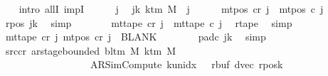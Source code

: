 \begin{isabellebody}
\ \ \isamarkupfalse%
\ {\isacharparenleft}{\kern0pt}intro\ allI\ impI{\isacharparenright}{\kern0pt}\isanewline
\ \ \ \ \isamarkupfalse%
\ j\ \isamarkupfalse%
\ jk{\isacharcolon}{\kern0pt}\ {\isachardoublequoteopen}k{\isacharunderscore}{\kern0pt}tm\ M\ {\isasymle}\ j{\isachardoublequoteclose}\isanewline
\ \ \ \ \isamarkupfalse%
\ {\isachardoublequoteopen}mt{\isacharunderscore}{\kern0pt}pos\ c{\isacharunderscore}{\kern0pt}r\ j\ {\isacharequal}{\kern0pt}\ mt{\isacharunderscore}{\kern0pt}pos\ c{\isacharprime}{\kern0pt}\ j{\isachardoublequoteclose}\ \isamarkupfalse%
\ r{\isacharunderscore}{\kern0pt}pos\ jk\ \isamarkupfalse%
\ simp\isanewline
\ \ \ \ \isamarkupfalse%
\ \isamarkupfalse%
\ {\isachardoublequoteopen}mt{\isacharunderscore}{\kern0pt}tape\ c{\isacharunderscore}{\kern0pt}r\ j\ {\isacharequal}{\kern0pt}\ mt{\isacharunderscore}{\kern0pt}tape\ c{\isacharprime}{\kern0pt}\ j{\isachardoublequoteclose}\ \isamarkupfalse%
\ r{\isacharunderscore}{\kern0pt}tape\ \isamarkupfalse%
\ simp\isanewline
\ \ \ \ \isamarkupfalse%
\ \isamarkupfalse%
\ {\isachardoublequoteopen}mt{\isacharunderscore}{\kern0pt}tape\ c{\isacharunderscore}{\kern0pt}r\ j\ {\isacharparenleft}{\kern0pt}mt{\isacharunderscore}{\kern0pt}pos\ c{\isacharunderscore}{\kern0pt}r\ j{\isacharparenright}{\kern0pt}\ {\isacharequal}{\kern0pt}\ BLANK{}{\isachardoublequoteclose}\isanewline
\ \ \ \ \ \ \isamarkupfalse%
\ pad{\isacharunderscore}{\kern0pt}c{\isacharprime}{\kern0pt}\ jk\ \isamarkupfalse%
\ simp\isanewline
\ \ \isamarkupfalse%
\isanewline
\ \ \isamarkupfalse%
\ src{\isacharunderscore}{\kern0pt}cr{\isacharcolon}{\kern0pt}\ {\isachardoublequoteopen}ar{\isacharunderscore}{\kern0pt}stage{\isacharunderscore}{\kern0pt}bounded\ {\isacharparenleft}{\kern0pt}bl{\isacharunderscore}{\kern0pt}tm\ M{\isacharparenright}{\kern0pt}\ {\isacharparenleft}{\kern0pt}k{\isacharunderscore}{\kern0pt}tm\ M{\isacharparenright}{\kern0pt}\isanewline
\ \ \ \ \ \ \ \ \ \ \ \ \ \ \ \ \ \ {\isacharparenleft}{\kern0pt}AR{\isacharunderscore}{\kern0pt}SimCompute{\isacharcomma}{\kern0pt}\ k{\isacharunderscore}{\kern0pt}unidx\ {}{\isacharcomma}{\kern0pt}\ {}{\isacharcomma}{\kern0pt}\ {\isacharquery}{\kern0pt}rbuf{\isacharcomma}{\kern0pt}\ dvec{\isacharcomma}{\kern0pt}\ {\isacharquery}{\kern0pt}rposk{\isacharparenright}{\kern0pt}{\isachardoublequoteclose}\isanewline

\end{isabellebody}
